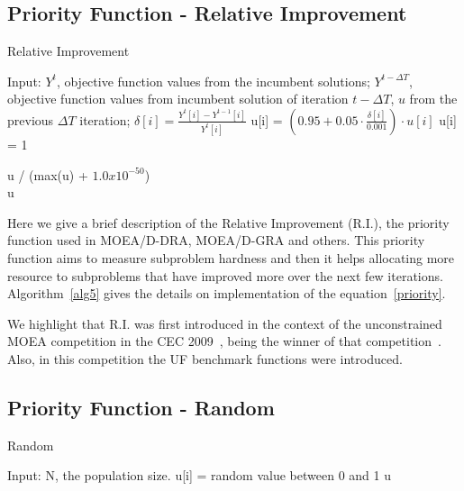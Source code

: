 \subsection{Priority Function - Relative Improvement}  

\begin{algorithm}[t]
	\caption{Relative Improvement}\label{alg5}
	\begin{algorithmic}[1]
		
		\State Input:   $Y^t$, objective function values from the incumbent solutions; $Y^{t-\Delta T}$, objective function values from incumbent solution of iteration $t -\Delta T$, $u$ from the previous $\Delta T$ iteration;
		\State $\delta[i] = \frac{Y^t[i] - Y^{t-1}[i]}{Y^t[i]}$
		\State u[i] = $(0.95 + 0.05 \cdot \frac{\delta[i]}{0.001}) \cdot u[i]$
		\Else 
		\State u[i] = 1
		\EndIf
		
		
		\EndFor
		
		\State u / (max(u) + $1.0 x 10^{-50}$)\\
		\Return u
	\end{algorithmic}
\end{algorithm}

Here we give a brief description of the Relative Improvement (R.I.), the priority function used in MOEA/D-DRA, MOEA/D-GRA and others. This priority function aims to measure subproblem hardness and then it helps allocating more resource to subproblems that have  improved more over the next few iterations. Algorithm~\ref{alg5} gives the details on implementation of the equation~\ref{priority}. 

We highlight that R.I. was first introduced in the context of the unconstrained MOEA competition in the CEC 2009~\cite{zhang2009performance}, being the winner of that competition~\cite{zhang2008multiobjective}. Also, in this competition the UF benchmark functions were introduced.

\subsection{Priority Function - Random}

\begin{algorithm}[t]
	\caption{Random}\label{alg4}
	\begin{algorithmic}[1]
		
		\State Input:  N, the population size.
		\For {i=1 to N}
		\State u[i] = random value between 0 and 1
		\EndFor
		\Return u
	\end{algorithmic}
\end{algorithm}

